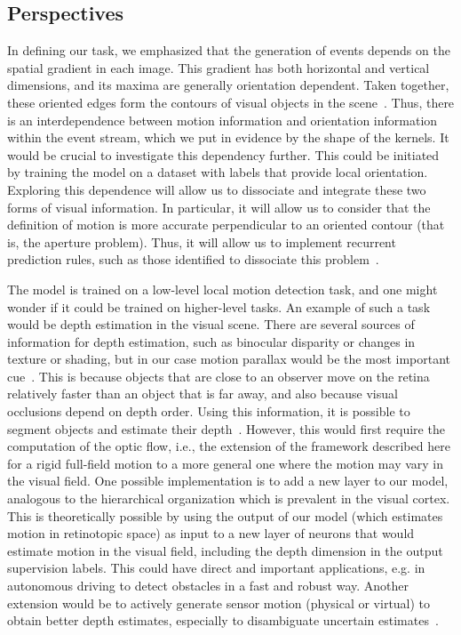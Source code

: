 \documentclass[default]{sn-jnl}%
\theoremstyle{thmstyleone}%
\theoremstyle{thmstyletwo}%
\theoremstyle{thmstylethree}%
\begin{document}
\subsection{Perspectives}
%
In defining our task, we emphasized that the generation of events depends on the spatial gradient in each image. This gradient has both horizontal and vertical dimensions, and its maxima are generally orientation dependent. Taken together, these oriented edges form the contours of visual objects in the scene~\citep{koenderink_representation_1987}. Thus, there is an interdependence between motion information and orientation information within the event stream, which we put in evidence by the shape of the kernels. It would be crucial to investigate this dependency further. This could be initiated by training the model on a dataset with labels that provide local orientation. Exploring this dependence will allow us to dissociate and integrate these two forms of visual information. In particular, it will allow us to consider that the definition of motion is more accurate perpendicular to an oriented contour (that is, the aperture problem). Thus, it will allow us to implement recurrent prediction rules, such as those identified to dissociate this problem~\citep{perrinet_motion-based_2012}.

The model is trained on a low-level local motion detection task, and one might wonder if it could be trained on higher-level tasks. An example of such a task would be depth estimation in the visual scene. There are several sources of information for depth estimation, such as binocular disparity or changes in texture or shading, but in our case motion parallax would be the most important cue~\citep{rogers_motion_1979}. This is because objects that are close to an observer move on the retina relatively faster than an object that is far away, and also because visual occlusions depend on depth order. Using this information, it is possible to segment objects and estimate their depth~\citep{yoonessi_contribution_2011}. However, this would first require the computation of the optic flow, i.e., the extension of the framework described here for a rigid full-field motion to a more general one where the motion may vary in the visual field. One possible implementation is to add a new layer to our model, analogous to the hierarchical organization which is prevalent in the visual cortex. This is theoretically possible by using the output of our model (which estimates motion in retinotopic space) as input to a new layer of neurons that would estimate motion in the visual field, including the depth dimension in the output supervision labels. This could have direct and important applications, e.g. in autonomous driving to detect obstacles in a fast and robust way. Another extension would be to actively generate sensor motion (physical or virtual) to obtain better depth estimates, especially to disambiguate uncertain estimates~\citep{nawrot_eye_2003}.
\end{document}
